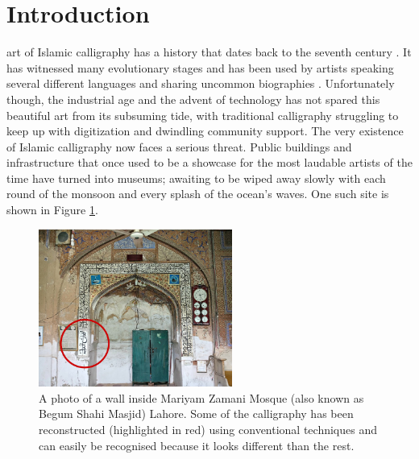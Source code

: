 \section{Introduction}
\label{Chapter:Introduction}
{
     art of Islamic calligraphy has a history that dates back to the seventh century \cite{bib01, bib02}. It has witnessed many evolutionary stages \cite{bib02, bib03} and has been used by artists speaking several different languages \cite{bib04} and sharing uncommon biographies \cite{bib05,bib06,bib07,bib08}. Unfortunately though, the industrial age and the advent of technology has not spared this beautiful art from its subsuming tide, with traditional calligraphy struggling to keep up with digitization and dwindling community support. The very existence of Islamic calligraphy now faces a serious threat. Public buildings and infrastructure that once used to be a showcase for the most laudable artists of the time have turned into museums; awaiting to be wiped away slowly with each round of the monsoon and every splash of the ocean’s waves. One such site is shown in Figure \ref{Fig:BegumShahi}.

    \begin{figure}[!t]
        \centering
        \includegraphics[width=2.5in]{../Images/BegumShahi.jpg}
        \caption{A photo of a wall inside Mariyam Zamani Mosque (also known as Begum Shahi Masjid) Lahore. Some of the calligraphy has been reconstructed (highlighted in red) using conventional techniques and can easily be recognised because it looks different than the rest.}
        \label{Fig:BegumShahi}
    \end{figure}
%
%


}
